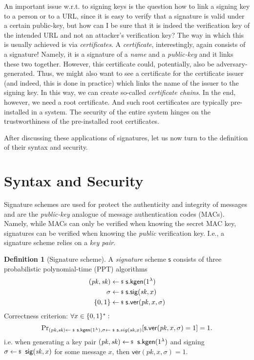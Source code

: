 \documentclass[a4paper,table,dvipsnames]{article}
\theoremstyle{definition}
\newtheorem{definition}{Definition}[section]
\renewcommand{\O}[1]{\ensuremath{\mathsf{#1}}}
\newcommand{\pcvar}[1]{\ensuremath{\mathit{#1}}}
\newcommand{\ver}{\O{ver}} %
\newcommand{\kgen}{\O{kgen}}
\newcommand{\s}{\O{s}}
\newcommand{\pk}{\pcvar{pk}}
\newcommand{\sk}{\pcvar{sk}}
\renewcommand{\sig}{\O{sig}}
\begin{document}
An important issue w.r.t. to signing keys is the question how to link a signing key to a person
or to a URL, since it is easy to verify that a signature is valid under a certain public-key,
but how can I be sure that it is indeed the verification key of the intended URL and not an
attacker's verification key? The way in which this is usually achieved is via \emph{certificates}.
A \emph{certificate}, interestingly, again consists of a signature! Namely, it is a signature
of a \emph{name} and a \emph{public-key} and it links these two together. However, this certificate
could, potentially, also be adversary-generated. Thus, we might also want to see a certificate for
the certificate issuer (and indeed, this is done in practice) which links the name of the issuer
to the signing key. In this way, we can create so-called \emph{certificate chains}. In the end,
however, we need a root certificate. And such root certificates are typically pre-installed in
a system. The security of the entire system hinges on the trustworthiness of the pre-installed
root certificates.

After discussing these applications of signatures, let us now turn to the definition of their
syntax and security.



\section{Syntax and Security}
Signature schemes are used for protect the authenticity and integrity of messages and are the \emph{public-key} analogue of message authentication codes (MACs). Namely, while MACs can only be verified when knowing the secret MAC key, signatures can be verified when knowing the \emph{public} verification key. I.e., a signature scheme relies on a \emph{key pair}.

\begin{definition}[Signature scheme]
    A \emph{signature} scheme $\s$ consists of three probabilistic polynomial-time (PPT) algorithms
    \begin{align*} 
      (\pk,\sk)\sample&\s.\kgen(1^\lambda) \\
      \sigma\sample&\s.\sig(\sk,x) \\
      \bin \sample &\s.\ver(\pk,x,\sigma)
    \end{align*}
    Correctness criterion: $\forall x\in\{0,1\}^*:$
      \[\probsub{(\pk,\sk)\sample\s.\kgen(1^\lambda),\sigma\sample\s.sig(\sk,x)}{\s.\ver(\pk,x,\sigma)=1}=1.\]
    i.e. when generating a key pair $(\pk,\sk)\sample\s.\kgen(1^\lambda)$ and signing $\sigma\sample\sig(\sk,x)$ for some message $x$, then $\ver(\pk,x,\sigma)=1$.
\end{definition}
\end{document}

